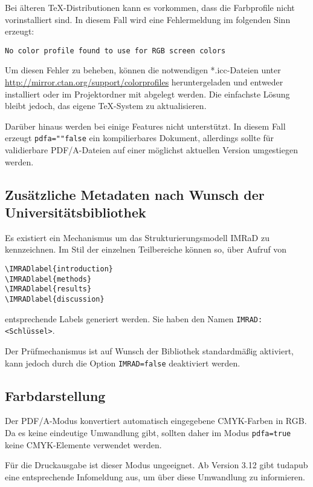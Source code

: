 \documentclass[
	ngerman,
	accentcolor=9c,%
	]{tudapub}
\let\code\texttt
\let\cls\textsf
\begin{document}

Bei älteren \TeX-Distributionen kann es vorkommen, dass die Farbprofile nicht vorinstalliert sind. In diesem Fall wird eine Fehlermeldung im folgenden Sinn erzeugt:
\begin{verbatim}
No color profile found to use for RGB screen colors
\end{verbatim}
Um diesen Fehler zu beheben, können die notwendigen *.icc-Dateien unter \url{http://mirror.ctan.org/support/colorprofiles} heruntergeladen und entweder installiert oder im Projektordner mit abgelegt werden. Die einfachste Lösung bleibt jedoch, das eigene \TeX-System zu aktualisieren.

Darüber hinaus werden bei  einige Features nicht unterstützt. In diesem Fall erzeugt \code{pdfa=""false} ein kompilierbares Dokument, allerdings sollte für validierbare PDF/A-Dateien auf  einer möglichst aktuellen Version umgestiegen werden.

\subsection{Zusätzliche Metadaten nach Wunsch der Universitätsbibliothek}
\label{sec:IMRAD}
Es existiert ein Mechanismus um das Strukturierungsmodell IMRaD \cite{imrad} zu kennzeichnen.
Im Stil der einzelnen Teilbereiche können so, über Aufruf von

\begin{verbatim}
\IMRADlabel{introduction}
\IMRADlabel{methods}
\IMRADlabel{results}
\IMRADlabel{discussion}
\end{verbatim}
entsprechende Labels generiert werden. Sie haben den Namen \code{IMRAD:<Schlüssel>}.

Der Prüfmechanismus ist auf Wunsch der Bibliothek standardmäßig aktiviert, kann jedoch durch die Option \code{IMRAD=false} deaktiviert werden.

\subsection{Farbdarstellung}
\label{sec:pdfa-color}
Der PDF/A-Modus konvertiert automatisch eingegebene CMYK-Farben in RGB. Da es keine eindeutige Umwandlung gibt, sollten daher im Modus \code{pdfa=true} keine CMYK-Elemente verwendet werden.

Für die Druckausgabe ist dieser Modus ungeeignet. Ab Version 3.12 gibt \cls{tudapub} eine entsprechende Infomeldung aus, um über diese Umwandlung zu informieren.
\end{document}
